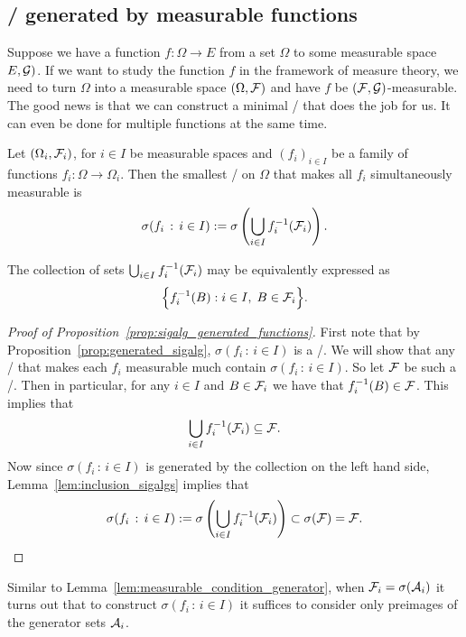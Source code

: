 \subsection{\sigalgs/ generated by measurable functions}

Suppose we have a function $f : \Omega \to E$ from a set $\Omega$ to some measurable space $E, \mathcal G)$. If we want to study the function $f$ in the framework of measure theory, we need to turn $\Omega$ into a measurable space $(\Omega, \mathcal F)$ and have $f$ be $(\mathcal F, \mathcal G)$-measurable. The good news is that we can construct a minimal \sigalg/ that does the job for us. It can even be done for multiple functions at the same time.

\begin{proposition}\label{prop:sigalg_generated_functions}
Let $(\Omega_i, \mathcal F_i)$, for $i \in I$ be measurable spaces and $(f_i)_{i \in I}$ be a family of functions $f_i : \Omega \to \Omega_i$. Then the smallest \sigalg/ on $\Omega$ that makes all $f_i$ simultaneously measurable is
\[
	\sigma(f_i \, : \, i \in I):=\sigma\left(\bigcup_{i \in I} f_i^{-1}(\mathcal F_i)\right).
\] 
\end{proposition}

\begin{remark}
	The collection of sets $\bigcup_{i \in I} f_i^{-1}(\mathcal F_i)$ may be equivalently expressed as
	\[
		\Bigl\{f_i^{-1}(B) : i\in I,\; B\in \mathcal F_i\Bigr\}.
	\]
\end{remark}


\begin{proof}[Proof of Proposition~\ref{prop:sigalg_generated_functions}]
First note that by Proposition~\ref{prop:generated_sigalg}, $\sigma(f_i \, : \, i \in I)$ is a \sigalg/. We will show that any \sigalg/ that makes each $f_i$ measurable much contain $\sigma(f_i \, : \, i \in I)$. So let $\mathcal F$ be such a \sigalg/. Then in particular, for any $i\in I$ and $B \in \mathcal F_i$ we have that $f_i^{-1}(B) \in \mathcal F$. This implies that
\[
	\bigcup_{i \in I} f_i^{-1}(\mathcal F_i) \subseteq \mathcal F.
\]
Now since $\sigma(f_i \, : \, i \in I)$ is generated by the collection on the left hand side, Lemma~\ref{lem:inclusion_sigalgs} implies that 
\[
	\sigma(f_i \, : \, i \in I):=\sigma\left(\bigcup_{i \in I} f_i^{-1}(\mathcal F_i)\right) \subset \sigma(\mathcal F) = \mathcal F.\qedhere
\]
\end{proof}

Similar to Lemma~\ref{lem:measurable_condition_generator}, when $\mathcal F_i = \sigma(\mathcal A_i)$ it turns out that to construct $\sigma(f_i \, : \, i \in I)$ it suffices to consider only preimages of the generator sets $\mathcal A_i$.

